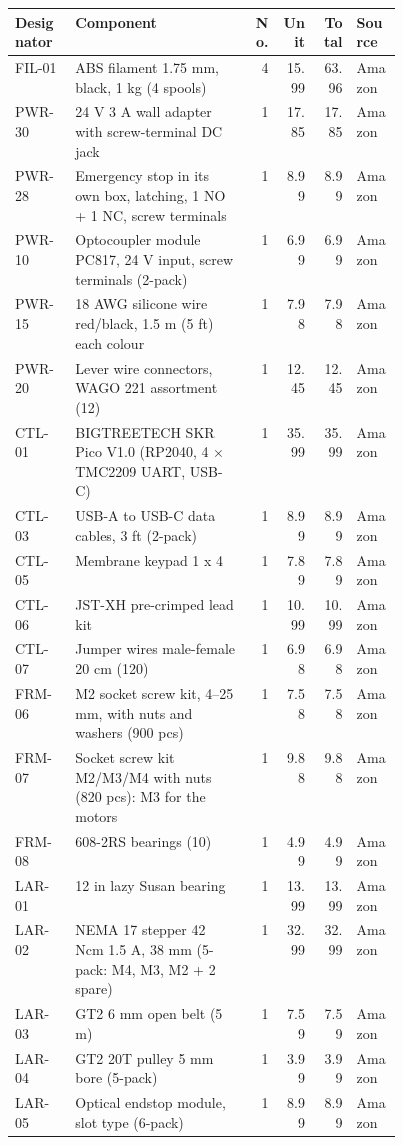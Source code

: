 \begin{tabular}{lp{0.45\linewidth}rrrl}
\textbf{Designator} & \textbf{Component} & \textbf{No.} & \textbf{Unit} & \textbf{Total} & \textbf{Source} \\ \hline
FIL-01 & ABS filament 1.75 mm, black, 1 kg (4 spools) & 4 & 15.99 & 63.96 & Amazon \\
PWR-30 & 24 V 3 A wall adapter with screw-terminal DC jack & 1 & 17.85 & 17.85 & Amazon \\
PWR-28 & Emergency stop in its own box, latching, 1 NO + 1 NC, screw terminals & 1 & 8.99 & 8.99 & Amazon \\
PWR-10 & Optocoupler module PC817, 24 V input, screw terminals (2-pack) & 1 & 6.99 & 6.99 & Amazon \\
PWR-15 & 18 AWG silicone wire red/black, 1.5 m (5 ft) each colour & 1 & 7.98 & 7.98 & Amazon \\
PWR-20 & Lever wire connectors, WAGO 221 assortment (12) & 1 & 12.45 & 12.45 & Amazon \\
CTL-01 & BIGTREETECH SKR Pico V1.0 (RP2040, 4 $\times$ TMC2209 UART, USB-C) & 1 & 35.99 & 35.99 & Amazon \\
CTL-03 & USB-A to USB-C data cables, 3 ft (2-pack) & 1 & 8.99 & 8.99 & Amazon \\
CTL-05 & Membrane keypad 1 x 4 & 1 & 7.89 & 7.89 & Amazon \\
CTL-06 & JST-XH pre-crimped lead kit & 1 & 10.99 & 10.99 & Amazon \\
CTL-07 & Jumper wires male-female 20 cm (120) & 1 & 6.98 & 6.98 & Amazon \\
FRM-06 & M2 socket screw kit, 4–25 mm, with nuts and washers (900 pcs) & 1 & 7.58 & 7.58 & Amazon \\
FRM-07 & Socket screw kit M2/M3/M4 with nuts (820 pcs): M3 for the motors & 1 & 9.88 & 9.88 & Amazon \\
FRM-08 & 608-2RS bearings (10) & 1 & 4.99 & 4.99 & Amazon \\
LAR-01 & 12 in lazy Susan bearing & 1 & 13.99 & 13.99 & Amazon \\
LAR-02 & NEMA 17 stepper 42 Ncm 1.5 A, 38 mm (5-pack: M4, M3, M2 + 2 spare) & 1 & 32.99 & 32.99 & Amazon \\
LAR-03 & GT2 6 mm open belt (5 m) & 1 & 7.59 & 7.59 & Amazon \\
LAR-04 & GT2 20T pulley 5 mm bore (5-pack) & 1 & 3.99 & 3.99 & Amazon \\
LAR-05 & Optical endstop module, slot type (6-pack) & 1 & 8.99 & 8.99 & Amazon \\

\end{tabular}
